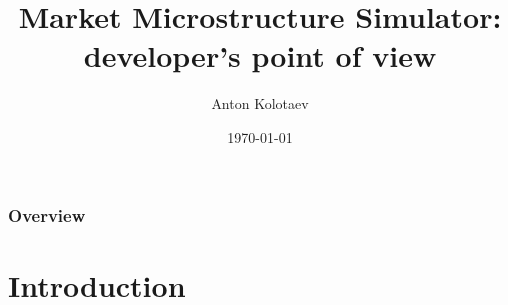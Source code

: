 \documentclass{beamer}
\title[FiQuant Market Simulator]{Market Microstructure Simulator: developer's point of view} %
\author{Anton Kolotaev} %
\institute[ECP] %
{
Chair of Quantitative Finance, \'{E}cole Centrale Paris \\ %
\medskip
\textit{anton.kolotaev@gmail.com} %
}
\date{\today} %
\begin{document}
\begin{frame}
\titlepage %
\end{frame}

\begin{frame}
\frametitle{Overview} %
\tableofcontents %
\end{frame}


\section{Introduction} 
\end{document}
